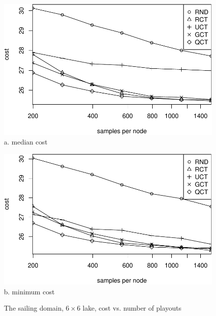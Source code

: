 \documentclass{article}
\begin{document}
\begin{figure}[t]
  \begin{minipage}[b]{0.5\linewidth}
    \centering
    \includegraphics[scale=0.45]{costs-size=6-group=median.pdf}\\
    a. median cost
  \end{minipage}
  \begin{minipage}[b]{0.5\linewidth}
    \centering
    \includegraphics[scale=0.45]{costs-size=6-group=minimum.pdf}\\
    b. minimum cost
  \end{minipage}
  \caption{The sailing domain, $6\times 6$ lake, cost vs. number of playouts}
  \label{fig:sailing-cost-vs-nsamples}
\end{figure}
\end{document}
